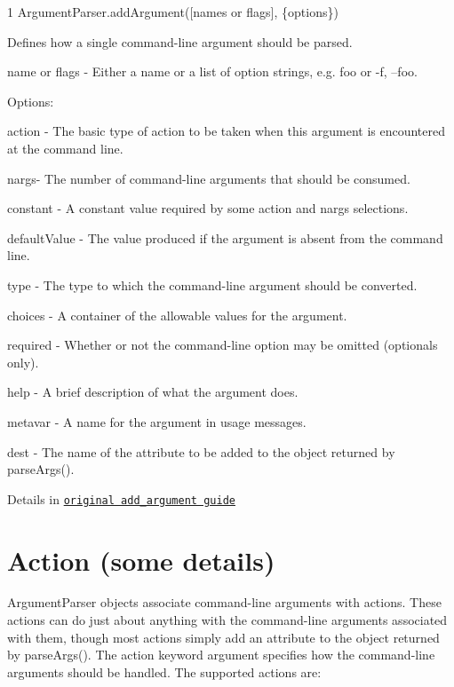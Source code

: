 \begin{DoxyCode}
1 ArgumentParser.addArgument([names or flags], \{options\})
\end{DoxyCode}


Defines how a single command-\/line argument should be parsed.


\begin{DoxyItemize}
\item {\ttfamily name or flags} -\/ Either a name or a list of option strings, e.\+g. foo or -\/f, --foo.
\end{DoxyItemize}

Options\+:


\begin{DoxyItemize}
\item {\ttfamily action} -\/ The basic type of action to be taken when this argument is encountered at the command line.
\item {\ttfamily nargs}-\/ The number of command-\/line arguments that should be consumed.
\item {\ttfamily constant} -\/ A constant value required by some action and nargs selections.
\item {\ttfamily default\+Value} -\/ The value produced if the argument is absent from the command line.
\item {\ttfamily type} -\/ The type to which the command-\/line argument should be converted.
\item {\ttfamily choices} -\/ A container of the allowable values for the argument.
\item {\ttfamily required} -\/ Whether or not the command-\/line option may be omitted (optionals only).
\item {\ttfamily help} -\/ A brief description of what the argument does.
\item {\ttfamily metavar} -\/ A name for the argument in usage messages.
\item {\ttfamily dest} -\/ The name of the attribute to be added to the object returned by parse\+Args().
\end{DoxyItemize}

Details in \href{http://docs.python.org/dev/library/argparse.html#the-add-argument-method}{\tt original add\+\_\+argument guide}

\section*{Action (some details) }

Argument\+Parser objects associate command-\/line arguments with actions. These actions can do just about anything with the command-\/line arguments associated with them, though most actions simply add an attribute to the object returned by parse\+Args(). The action keyword argument specifies how the command-\/line arguments should be handled. The supported actions are\+:


